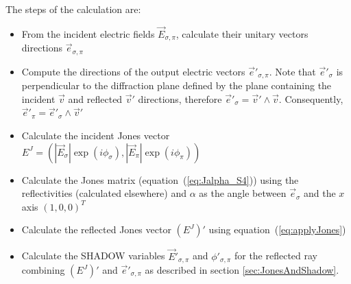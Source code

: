 \documentclass{iucr}
\newcommand{\todo}[1]{{\color{red}[TODO: "#1'']}}
\begin{document}
The steps of the calculation are:

\begin{itemize}
    \item From the incident electric fields $\vec{E}_{\sigma,\pi}$, calculate their unitary vectors directions $\vec{e}_{\sigma,\pi}$

    \item Compute the directions of the output electric vectors $\vec{e}'_{\sigma,\pi}$. Note that $\vec{e}'_{\sigma}$ is perpendicular to the diffraction plane defined by the plane containing the incident $\vec{v}$ and reflected $\vec{v}'$ directions, therefore $\vec{e}'_\sigma=\vec{v}' \wedge \vec{v}$. Consequently, $\vec{e}'_\pi=\vec{e}'_\sigma \wedge \vec{v}'$
        
    \item Calculate the incident Jones vector $E^J=(|\vec{E}_\sigma| \exp(i\phi_\sigma), |\vec{E}_\pi| \exp(i\phi_\pi))$
    \item Calculate the Jones matrix (equation~(\ref{eq:Jalpha_S4})) using the reflectivities (calculated elsewhere) and $\alpha$ as the angle between $\vec{e}_\sigma$ and the $x$ axis $(1,0,0)^T$
    \item Calculate the reflected Jones vector $(E^J)'$ using equation~(\ref{eq:applyJones})
    \item Calculate the SHADOW variables $\vec{E}'_{\sigma,\pi}$ and $\phi'_{\sigma,\pi}$ for the reflected ray combining $(E^J)'$ and $\vec{e}'_{\sigma, \pi}$ as described in section \ref{sec:JonesAndShadow}.
\end{itemize}





    
\end{document}
